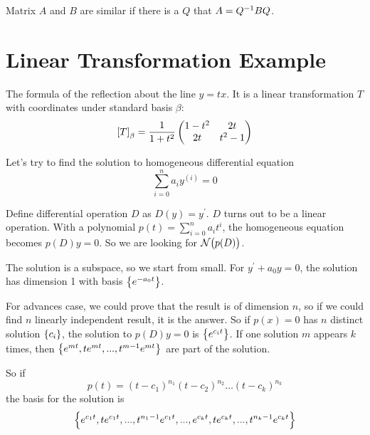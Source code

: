 \begin{definition}
    Matrix $A$ and $B$ are similar if there is a $Q$ that $A = {Q}^{-1} B Q$.    
\end{definition}


%
%
%
%

\section{Linear Transformation Example}


\begin{example}
    The formula of the reflection about the line $y=tx$. It is a linear transformation $T$ with coordinates under standard basis $\beta$:
    \begin{equation*}
        \coordinate{T}_\beta = \frac{1}{1 + t^2} \begin{pmatrix}
            1-t^2 & 2t \\
            2t & t^2 -1
        \end{pmatrix}
    \end{equation*}
\end{example}


\begin{example}
    Let's try to find the solution to homogeneous differential equation 
    \begin{equation*}
        \sum_{i=0}^n a_i y^{(i)} = 0
    \end{equation*}
    
    Define differential operation $D$ as $D(y) = y^\prime$. $D$ turns out to be a linear operation. With a polynomial $p(t) = \sum_{i=0}^n a_i t^i$, the homogeneous equation becomes $p(D)y = 0$. So we are looking for $\nullspace{p(D)}$.
    
    The solution is a subspace, so we start from small. For $y^\prime + a_0 y = 0$, the solution has dimension 1 with basis $\set{e^{-a_0 t}}$.
    
    For advances case, we could prove that the result is of dimension $n$, so if we could find $n$ linearly independent result, it is the answer. So if $p(x) = 0$ has $n$ distinct solution $\set{c_i}$, the solution to $p(D)y = 0$ is $\set{e^{c_i t}}$. If one solution $m$ appears $k$ times, then $\set{e^{mt}, t e^{mt}, ..., t^{m-1} e^{mt}}$ are part of the solution. 
    
    So if 
    \begin{equation*}
        p(t) = (t-c_1)^{n_1} (t-c_2)^{n_2} \hdots (t-c_k)^{n_k} 
    \end{equation*}
    the basis for the solution is 
    \begin{equation*}
        \set{e^{c_1 t}, t e^{c_1 t}, ... , t^{n_1 -1} e^{c_1 t}, ... ,  e^{c_k t}, t e^{c_k t}, ..., t^{n_k -1} e^{c_k t}}
    \end{equation*}
\end{example}


